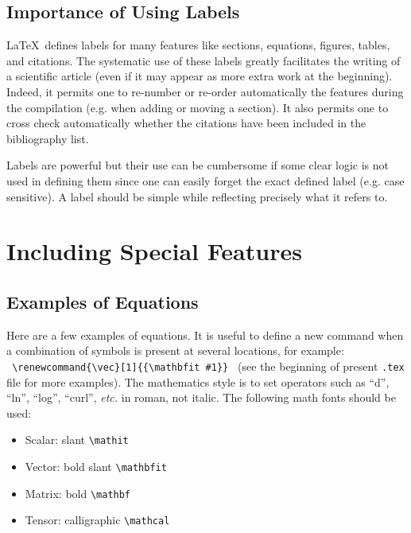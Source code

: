 \documentclass[namedreferences,hyperref,optionalrh,solaromanenum]{spr-sola}
\renewcommand{\vec}[1]{{\mathbfit #1}}
\begin{document}
\subsection{Importance of Using Labels} %
  \label{S-labels}

    \LaTeX\ defines labels for many features like sections, 
equations, figures, tables, and citations.  The systematic use
of these labels greatly facilitates the writing of a scientific
article (even if it may appear as more extra work at the beginning).
Indeed, it permits one to re-number or re-order automatically the
features during the compilation (e.g. when adding or moving a 
section).  It also permits one to
cross check automatically whether the citations have been included
in the bibliography list.

    Labels are powerful but their use can be cumbersome if some
clear logic is not used in defining them since one can easily
forget the exact defined label (e.g. case sensitive).
A label should be simple while reflecting precisely what it refers to. 
    
\section{Including Special Features} %
      \label{S-features}      

\subsection{Examples of Equations} %
\label{S-equations}
Here are a few examples of equations. It is useful to define
a new command when a combination of symbols is present at several 
locations, for example:\\
  \verb+ \renewcommand{\vec}[1]{{\mathbfit #1}} + 
(see the beginning of present \texttt{.tex} file for more examples). 
The mathematics style is to set operators such as ``d'', ``ln'', ``log'', 
``curl'', \textit{etc.} in roman, not italic.
The following math fonts should be used:
\begin{itemize}
\item Scalar: slant \verb+\mathit+
\item Vector: bold slant \verb+\mathbfit+
\item Matrix: bold \verb+\mathbf+
\item Tensor: calligraphic \verb+\mathcal+
\end{itemize}
  
\end{document}
